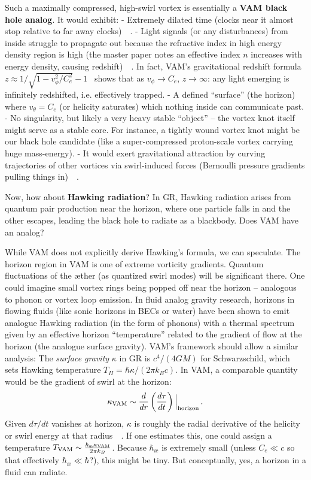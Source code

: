 \documentclass[a4paper,12pt]{article}
\begin{document}
    Such a maximally compressed, high-swirl vortex is essentially a \textbf{VAM black hole analog}. It would exhibit:
    - Extremely dilated time (clocks near it almost stop relative to far away clocks)~\cite{reference_124}~\cite{reference_125}.
    - Light signals (or any disturbances) from inside struggle to propagate out because the refractive index in high energy density region is high (the master paper notes an effective index $n$ increases with energy density, causing redshift)~\cite{reference_126}~\cite{reference_127}. In fact, VAM’s gravitational redshift formula $z \approx 1/\sqrt{1 - v_\phi^2/C_e^2} - 1$~\cite{reference_128} shows that as $v_\phi \to C_e$, $z \to \infty$: any light emerging is infinitely redshifted, i.e. effectively trapped.
    - A defined “surface” (the horizon) where $v_\theta = C_e$ (or helicity saturates) which nothing inside can communicate past.
    - No singularity, but likely a very heavy stable “object” – the vortex knot itself might serve as a stable core. For instance, a tightly wound vortex knot might be our black hole candidate (like a super-compressed proton-scale vortex carrying huge mass-energy).
    - It would exert gravitational attraction by curving trajectories of other vortices via swirl-induced forces (Bernoulli pressure gradients pulling things in)~\cite{reference_129}~\cite{reference_130}.

    Now, how about \textbf{Hawking radiation}? In GR, Hawking radiation arises from quantum pair production near the horizon, where one particle falls in and the other escapes, leading the black hole to radiate as a blackbody. Does VAM have an analog?

    While VAM does not explicitly derive Hawking’s formula, we can speculate. The horizon region in VAM is one of extreme vorticity gradients. Quantum fluctuations of the æther (as quantized swirl modes) will be significant there. One could imagine small vortex rings being popped off near the horizon – analogous to phonon or vortex loop emission. In fluid analog gravity research, horizons in flowing fluids (like sonic horizons in BECs or water) have been shown to emit analogue Hawking radiation (in the form of phonons) with a thermal spectrum given by an effective horizon “temperature” related to the gradient of flow at the horizon (the analogue surface gravity). VAM’s framework should allow a similar analysis: The \emph{surface gravity} $\kappa$ in GR is $c^4/(4GM)$ for Schwarzschild, which sets Hawking temperature $T_H = \hbar \kappa/(2\pi k_B c)$. In VAM, a comparable quantity would be the gradient of swirl at the horizon:
    \[
        \kappa_{\rm VAM} \sim \frac{d}{dr}\left(\frac{d\tau}{dt}\right) \Big|_{\rm horizon}\,.
    \]
    Given $d\tau/dt$ vanishes at horizon, $\kappa$ is roughly the radial derivative of the helicity or swirl energy at that radius~\cite{reference_131}~\cite{reference_132}. If one estimates this, one could assign a temperature $T_{\rm VAM} \sim \frac{\hbar_{\text{\ae}} \kappa_{\rm VAM}}{2\pi k_B}$. Because $\hbar_{\text{\ae}}$ is extremely small (unless $C_e \ll c$ so that effectively $\hbar_{\text{\ae}} \ll \hbar$?), this might be tiny. But conceptually, yes, a horizon in a fluid can radiate.
\end{document}
